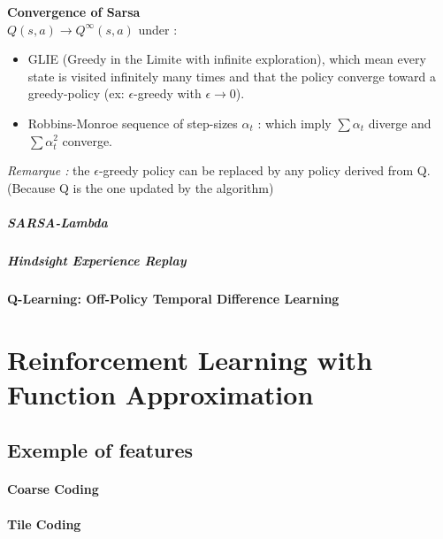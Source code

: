			\begin{theorem}
				\textbf{Convergence of Sarsa} \\
				$Q(s, a) \rightarrow Q^\infty(s,a)$ under :
				\begin{itemize}
					\item GLIE (Greedy in the Limite with infinite exploration), which mean every state is visited infinitely many times and that the policy converge toward a greedy-policy (ex: $\epsilon$-greedy with $\epsilon\rightarrow 0$).
					\item Robbins-Monroe sequence of step-sizes $\alpha_t$ : which imply $\sum \alpha_t$ diverge and $\sum \alpha_t^2$ converge.
				\end{itemize}
			\end{theorem}
			

			\emph{Remarque :} the $\epsilon$-greedy policy can be replaced by any policy derived from Q. (Because Q is the one updated by the algorithm)
			
			\subparagraph*{SARSA-Lambda}
			
			\subparagraph*{Hindsight Experience Replay}

		\paragraph*{Q-Learning: Off-Policy Temporal Difference Learning}



\section{Reinforcement Learning with Function Approximation} %
	\label{sec:reinforcement_learning_with_function_approximation}

	\subsection{Exemple of features} %
		\label{sub:exemple_of_features}

		\paragraph*{Coarse Coding}
		\paragraph*{Tile Coding}

